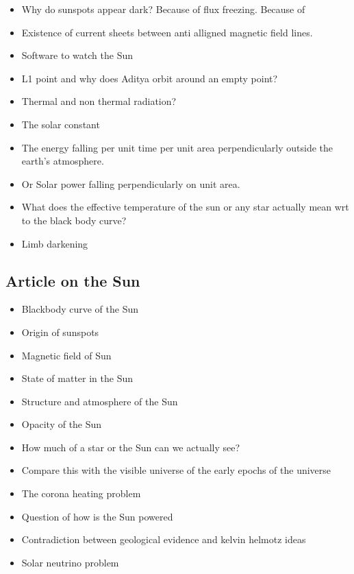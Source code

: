 \documentclass{../template/texnote}
\begin{document}
\begin{itemize}
\item Why do sunspots appear dark? Because of flux freezing. Because of 
\item Existence of current sheets between anti alligned magnetic field lines.
\item Software to watch the Sun
\item L1 point and why does Aditya orbit around an empty point?
\item Thermal and non thermal radiation?
\item The solar constant
\item The energy falling per unit time per unit area perpendicularly outside the earth’s atmosphere.
\item Or Solar power falling perpendicularly on unit area.
\item What does the effective temperature of the sun or any star actually mean wrt to the black body curve?

\item Limb darkening

\end{itemize}

\subsection{Article on the Sun}
\begin{itemize}
\item Blackbody curve of the Sun
\item Origin of sunspots
\item Magnetic field of Sun
\item State of matter in the Sun
\item Structure and atmosphere of the Sun
\item Opacity of the Sun
\item How much of a star or the Sun can we actually see?
\item Compare this with the visible universe of the early epochs of the universe
\item The corona heating problem
\item Question of how is the Sun powered
\item Contradiction between geological evidence and kelvin helmotz ideas
\item Solar neutrino problem

\end{itemize}
\end{document}
